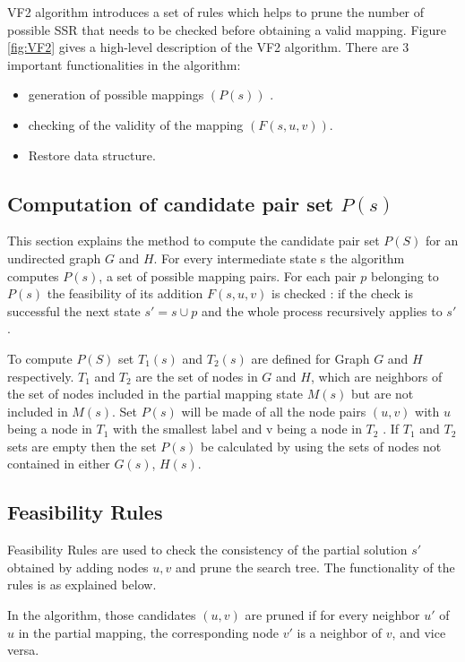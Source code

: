 VF2 algorithm introduces a set of rules which helps to prune the number of possible SSR that needs to be checked before obtaining a valid mapping. Figure \ref{fig:VF2} gives a high-level description of the VF2 algorithm.
There are 3 important functionalities in the algorithm: 
\begin{itemize}
\item generation of possible mappings $(P(s))$ .
\item checking of the validity of the mapping $(F(s,u,v))$.
\item Restore data structure.
\end{itemize}



\subsection{Computation of candidate pair set $P(s)$}
This section explains the method to compute the candidate pair set $P(S)$ for an undirected graph $G$ and $H$. 
For every intermediate state s the algorithm computes $P(s)$, a set of possible mapping pairs. For each pair $p$ belonging to $P(s)$ the feasibility of its addition $F(s,u,v)$ is checked : if the check is successful the next state $s' = s \cup p$ and the whole process recursively applies to $s'$.

To compute $P(S)$ set $T_1(s)$ and $T_2(s)$ are defined for Graph $G$ and $H$ respectively. $T_1$ and $T_2$ are the set of  nodes in $G$ and $H$, which are neighbors of the set of nodes included in the partial mapping state $M(s)$ but are not included in $M(s)$.
Set $P(s)$ will be made of all the node pairs $(u,v)$ with $u$ being a node in $T_1$ with the smallest label  and v being a node in $T_2$ . If  $T_1$ and $T_2$ sets are empty then the set $P(s)$ be calculated by using the sets of nodes not contained in either $G(s)$, $H(s)$.

\subsection{Feasibility Rules}
Feasibility Rules are used to check the consistency of the partial solution $s'$ obtained by adding nodes $u,v$ and prune the search tree. The functionality of the rules is as explained below.

In the algorithm, those candidates $(u,v)$ are pruned if for every neighbor $u'$ of $u$ in the partial mapping, the corresponding node $v'$ is a neighbor of $v$, and vice versa.

